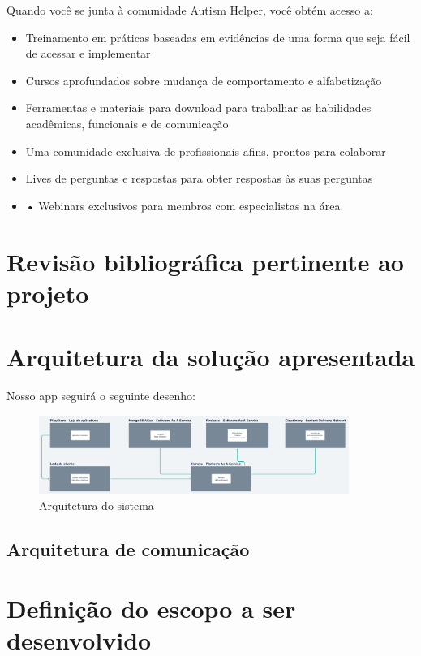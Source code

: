 Quando você se junta à comunidade Autism Helper, você obtém acesso a:

\begin{itemize}
    \item Treinamento em práticas baseadas em evidências de uma forma que seja fácil de acessar e implementar
    \item Cursos aprofundados sobre mudança de comportamento e alfabetização
    \item Ferramentas e materiais para download para trabalhar as habilidades acadêmicas, funcionais e de comunicação
    \item Uma comunidade exclusiva de profissionais afins, prontos para colaborar
    \item Lives de perguntas e respostas para obter respostas às suas perguntas
    \item •	Webinars exclusivos para membros com especialistas na área
\end{itemize}

\section{Revisão bibliográfica pertinente ao projeto}

\section{Arquitetura da solução apresentada}
Nosso app seguirá o seguinte desenho:

\begin{figure}[htb]

    \centering
	\caption{\label{fig_arq_virado}Arquitetura do sistema}
	\includegraphics[width=0.9\textwidth]{anexos/arquitetura.png}

	\end{figure}


\subsection{Arquitetura de comunicação}

\pagebreak

\section{Definição do escopo a ser desenvolvido}
